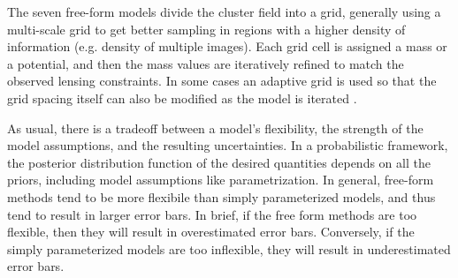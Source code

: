 The seven free-form models divide the cluster field into a grid,
generally using a multi-scale grid to get better sampling in regions
with a higher density of information (e.g. density of multiple
images). Each grid cell is assigned a mass or a potential, and then
the mass values are iteratively refined to match the observed lensing
constraints. In some cases an adaptive grid is used so that the grid
spacing itself can also be modified as the model is
iterated \citep[e.g.][]{Liesenborgs:2006,Merten:2009,Bradac:2009}.

As usual, there is a tradeoff between a model's flexibility, the
strength of the model assumptions, and the resulting uncertainties. In
a probabilistic framework, the posterior distribution function of the
desired quantities depends on all the priors, including model
assumptions like parametrization.  In general, free-form methods tend
to be more flexibile than simply parameterized models, and thus tend
to result in larger error bars.  In brief, if the free form methods
are too flexible, then they will result in overestimated error
bars. Conversely, if the simply parameterized models are too
inflexible, they will result in underestimated error bars.

\smallskip
{}



